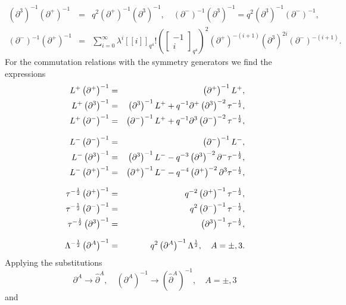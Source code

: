 \documentclass[a4paper,11pt,oneside]{article}
\begin{document}
\begin{eqnarray} \label{inv}
\left( \partial ^{3}\right) ^{-1}\left( \partial ^{+}\right) ^{-1}
&=&q^{2}\left( \partial ^{+}\right) ^{-1}\left( \partial ^{3}\right)
^{-1},\quad \left( \partial ^{-}\right) ^{-1}\left( \partial ^{3}\right)
^{-1}=q^{2}\left( \partial ^{3}\right) ^{-1}\left( \partial ^{-}\right)
^{-1}, \\
\left( \partial ^{-}\right) ^{-1}\left( \partial ^{+}\right) ^{-1}
&=&\sum_{i=0}^{\infty }\lambda ^{i}\left[ \left[ i\right] \right]
_{q^{4}}!\left(\left[\begin{array}{c} -1\\i\end{array}\right]_{q^{4}}\right) ^{2}\left( \partial
^{+}\right) ^{-\left( i+1\right) }\left( \partial ^{3}\right) ^{2i}\left(
\partial ^{-}\right) ^{-\left( i+1\right) }.  \nonumber
\end{eqnarray}
For the commutation relations with the symmetry generators we find the
expressions 
\begin{eqnarray}
L^{+}\left( \partial ^{+}\right) ^{-1} &=&\left( \partial ^{+}\right)
^{-1}L^{+}, \\
L^{+}\left( \partial ^{3}\right) ^{-1} &=&\left( \partial ^{3}\right)
^{-1}L^{+}+q^{-1}\partial ^{+}\left( \partial ^{3}\right) ^{-2}\tau ^{-\frac{%
1}{2}},  \nonumber \\
L^{+}\left( \partial ^{-}\right) ^{-1} &=&\left( \partial ^{-}\right)
^{-1}L^{+}+q^{-1}\partial ^{3}\left( \partial ^{-}\right) ^{-2}\tau ^{-\frac{%
1}{2}},  \nonumber \\[0.1in]
L^{-}\left( \partial ^{-}\right) ^{-1} &=&\left( \partial ^{-}\right)
^{-1}L^{-}, \\
L^{-}\left( \partial ^{3}\right) ^{-1} &=&\left( \partial ^{3}\right)
^{-1}L^{-}-q^{-3}\left( \partial ^{3}\right) ^{-2}\partial ^{-}\tau ^{-\frac{%
1}{2}},  \nonumber \\
L^{-}\left( \partial ^{+}\right) ^{-1} &=&\left( \partial ^{+}\right)
^{-1}L^{-}-q^{-4}\left( \partial ^{+}\right) ^{-2}\partial ^{3}\tau ^{-\frac{%
1}{2}},  \nonumber \\[0.1in]
\tau ^{-\frac{1}{2}}\left( \partial ^{+}\right) ^{-1} &=&q^{-2}\left(
\partial ^{+}\right) ^{-1}\tau ^{-\frac{1}{2}}, \\
\tau ^{-\frac{1}{2}}\left( \partial ^{-}\right) ^{-1} &=&q^{2}\left(
\partial ^{-}\right) ^{-1}\tau ^{-\frac{1}{2}},  \nonumber \\
\tau ^{-\frac{1}{2}}\left( \partial ^{3}\right) ^{-1} &=&\left( \partial
^{3}\right) ^{-1}\tau ^{-\frac{1}{2}},  \nonumber \\[0.1in]
\Lambda ^{-\frac{1}{2}}\left( \partial ^{A}\right) ^{-1} &=&q^{2}\left(
\partial ^{A}\right) ^{-1}\Lambda ^{\frac{1}{2}},\quad A=\pm ,3.
\end{eqnarray}
Applying the substitutions 
\begin{equation}
\partial ^{A}\rightarrow \hat{\partial}^{A},\quad \left( \partial
^{A}\right) ^{-1}\rightarrow \left( \hat{\partial}^{A}\right) ^{-1},\quad
A=\pm ,3
\end{equation}
and
\end{document}
